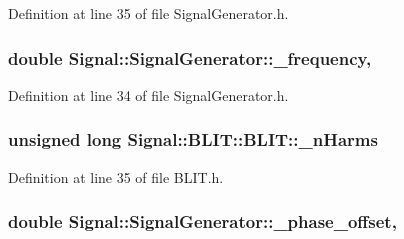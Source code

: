 Definition at line 35 of file Signal\+Generator.\+h.

\hypertarget{classSignal_1_1SignalGenerator_a7f107461333bce68c5dad412db96a8c2}{
\subsubsection[{\+\_\+frequency}]{\setlength{\rightskip}{0pt plus 5cm}double Signal\+::\+Signal\+Generator\+::\+\_\+frequency\hspace{0.3cm}{\ttfamily [protected]}, {\ttfamily [inherited]}}}\label{classSignal_1_1SignalGenerator_a7f107461333bce68c5dad412db96a8c2}


Definition at line 34 of file Signal\+Generator.\+h.

\hypertarget{classSignal_1_1BLIT_1_1BLIT_a0bfbf4e7515a42fab7df748b8497f648}{
\subsubsection[{\+\_\+n\+Harms}]{\setlength{\rightskip}{0pt plus 5cm}unsigned long Signal\+::\+B\+L\+I\+T\+::\+B\+L\+I\+T\+::\+\_\+n\+Harms\hspace{0.3cm}{\ttfamily [protected]}}}\label{classSignal_1_1BLIT_1_1BLIT_a0bfbf4e7515a42fab7df748b8497f648}


Definition at line 35 of file B\+L\+I\+T.\+h.

\hypertarget{classSignal_1_1SignalGenerator_a6b4444d46747c8517171edbbf4b5588f}{
\subsubsection[{\+\_\+phase\+\_\+offset}]{\setlength{\rightskip}{0pt plus 5cm}double Signal\+::\+Signal\+Generator\+::\+\_\+phase\+\_\+offset\hspace{0.3cm}{\ttfamily [protected]}, {\ttfamily [inherited]}}}\label{classSignal_1_1SignalGenerator_a6b4444d46747c8517171edbbf4b5588f}


